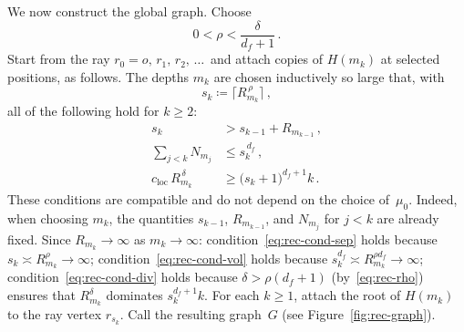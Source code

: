 \documentclass[11pt]{amsart}
\theoremstyle{plain}
\theoremstyle{definition}
\begin{document}
	We now construct the global graph.  Choose
	\begin{equation}\label{eq:rec-rho}
		0<\rho<\frac{\delta}{d_f+1}\,.
	\end{equation}
	Start from the ray $r_0{=}o,\,r_1,\,r_2,\,\ldots\,$ and attach copies of $H(m_k)$ at selected positions, as follows.
	The depths $m_k$ are chosen inductively so large that, with
	\begin{equation}\label{eq:rec-sk}
		s_k\coloneqq\bigl\lceil R_{m_k}^{\,\rho}\bigr\rceil\,,
	\end{equation}
	all of the following hold for $k\geq 2$:
	\begin{align}
		s_k&>s_{k-1}+R_{m_{k-1}}\,,
		\label{eq:rec-cond-sep}\\
		\sum_{j<k}N_{m_j}&\leq s_k^{\,d_f}\,,
		\label{eq:rec-cond-vol}\\
		c_{\mathrm{loc}}\,R_{m_k}^{\,\delta}
		&\geq \bigl(s_k{+}1\bigr)^{d_f+1} k\,.\label{eq:rec-cond-div}
	\end{align}
	These conditions are compatible and do not depend on the choice of~$\mu_0$.  Indeed, when choosing $m_k$, the quantities $s_{k-1}$, $R_{m_{k-1}}$, and $N_{m_j}$ for $j<k$ are already fixed.  Since $R_{m_k}\to\infty$ as $m_k\to\infty$: condition~\eqref{eq:rec-cond-sep} holds because $s_k\asymp R_{m_k}^{\rho}\to\infty$; condition~\eqref{eq:rec-cond-vol} holds because $s_k^{d_f}\asymp R_{m_k}^{\rho d_f} \to\infty$; condition~\eqref{eq:rec-cond-div} holds because $\delta>\rho(d_f{+}1)$ (by~\eqref{eq:rec-rho}) ensures that $R_{m_k}^{\delta}$ dominates $s_k^{d_f+1} k$. For each $k\geq 1$, attach the root of $H(m_k)$ to the ray vertex $r_{s_k}$.  Call the resulting graph~$G$ (see Figure~\ref{fig:rec-graph}).
	
\end{document}
